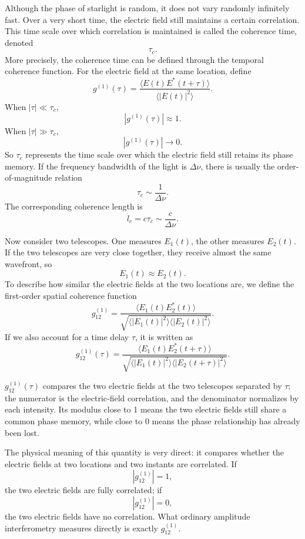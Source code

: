 Although the phase of starlight is random, it does not vary randomly infinitely fast. Over a very short time, the electric field still maintains a certain correlation. This time scale over which correlation is maintained is called the coherence time, denoted
\[
  \tau_c.
\]
More precisely, the coherence time can be defined through the temporal coherence function. For the electric field at the same location, define
\[
  g^{(1)}(\tau)
  =
  \frac{
    \langle E(t)E^\ast(t+\tau)\rangle
  }{
    \langle |E(t)|^2\rangle
  }.
\]
When \(|\tau|\ll \tau_c\),
\[
  |g^{(1)}(\tau)|\approx 1.
\]
When \(|\tau|\gg \tau_c\),
\[
  |g^{(1)}(\tau)|\rightarrow 0.
\]
So \(\tau_c\) represents the time scale over which the electric field still retains its phase memory. If the frequency bandwidth of the light is \(\Delta \nu\), there is usually the order-of-magnitude relation
\[
  \tau_c\sim \frac{1}{\Delta \nu}.
\]
The corresponding coherence length is
\[
  l_c=c\tau_c\sim \frac{c}{\Delta \nu}.
\]

Now consider two telescopes. One measures \(E_1(t)\), the other measures \(E_2(t)\). If the two telescopes are very close together, they receive almost the same wavefront, so
\[
  E_1(t)\approx E_2(t).
\]
To describe how similar the electric fields at the two locations are, we define the first-order spatial coherence function
\[
  g^{(1)}_{12}
  =
  \frac{
    \langle E_1(t)E_2^\ast(t)\rangle
  }{
    \sqrt{
      \langle |E_1(t)|^2\rangle
      \langle |E_2(t)|^2\rangle
    }
  }.
\]
If we also account for a time delay \(\tau\), it is written as
\[
  g^{(1)}_{12}(\tau)
  =
  \frac{
    \langle E_1(t)E_2^\ast(t+\tau)\rangle
  }{
    \sqrt{
      \langle |E_1(t)|^2\rangle
      \langle |E_2(t+\tau)|^2\rangle
    }
  }.
\]
\begin{formulaexplain}
\(g^{(1)}_{12}(\tau)\) compares the two electric fields at the two telescopes separated by \(\tau\); the numerator is the electric-field correlation, and the denominator normalizes by each intensity. Its modulus close to 1 means the two electric fields still share a common phase memory, while close to 0 means the phase relationship has already been lost.
\end{formulaexplain}
The physical meaning of this quantity is very direct: it compares whether the electric fields at two locations and two instants are correlated. If
\[
  |g^{(1)}_{12}|=1,
\]
the two electric fields are fully correlated; if
\[
  |g^{(1)}_{12}|=0,
\]
the two electric fields have no correlation. What ordinary amplitude interferometry measures directly is exactly \(g^{(1)}_{12}\).

